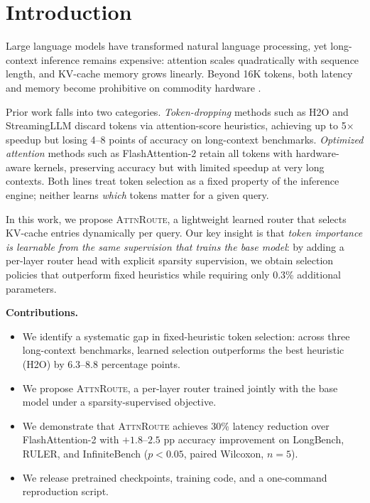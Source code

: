 \section{Introduction}

Large language models have transformed natural language processing, yet
long-context inference remains expensive: attention scales quadratically with
sequence length, and KV-cache memory grows linearly. Beyond 16K tokens,
both latency and memory become prohibitive on commodity hardware
\citep{vaswani2017attention, dao2023flashattention2}.

Prior work falls into two categories. \emph{Token-dropping} methods such as
H2O \citep{zhang2023h2o} and StreamingLLM \citep{xiao2023streamingllm} discard
tokens via attention-score heuristics, achieving up to 5$\times$ speedup but
losing 4--8 points of accuracy on long-context benchmarks. \emph{Optimized
attention} methods such as FlashAttention-2 \citep{dao2023flashattention2}
retain all tokens with hardware-aware kernels, preserving accuracy but with
limited speedup at very long contexts. Both lines treat token selection as a
fixed property of the inference engine; neither learns \emph{which} tokens
matter for a given query.

In this work, we propose \textsc{AttnRoute}, a lightweight learned router that
selects KV-cache entries dynamically per query. Our key insight is that
\emph{token importance is learnable from the same supervision that trains the
base model}: by adding a per-layer router head with explicit sparsity
supervision, we obtain selection policies that outperform fixed heuristics
while requiring only 0.3\% additional parameters.


\textbf{Contributions.}
\begin{itemize}
    \item We identify a systematic gap in fixed-heuristic token selection:
          across three long-context benchmarks, learned selection outperforms
          the best heuristic (H2O) by 6.3--8.8 percentage points.
    \item We propose \textsc{AttnRoute}, a per-layer router trained jointly
          with the base model under a sparsity-supervised objective.
    \item We demonstrate that \textsc{AttnRoute} achieves 30\% latency
          reduction over FlashAttention-2 with $+1.8$--$2.5$ pp accuracy
          improvement on LongBench, RULER, and InfiniteBench
          ($p<0.05$, paired Wilcoxon, $n=5$).
    \item We release pretrained checkpoints, training code, and a
          one-command reproduction script.
\end{itemize}


